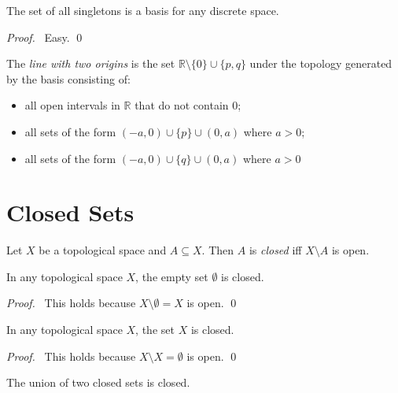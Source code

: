\begin{prop}
  The set of all singletons is a basis for any discrete space.
\end{prop}

\begin{proof}
  \pf\ Easy. \qed
\end{proof}

 \begin{df}
 The \emph{line with two origins} is the set $\mathbb{R} \setminus \{ 0 \}
 \cup \{ p,q \}$ under the topology generated by the basis consisting of:
 \begin{itemize}
   \item all open intervals in $\mathbb{R}$ that do not contain $0$;
   \item all sets of the form $(-a, 0) \cup \{ p \} \cup (0, a)$ where $a
> 0$;
\item all sets of the form $(-a, 0) \cup \{ q \} \cup (0, a)$ where $a > 0$
 \end{itemize}
\end{df}

\section{Closed Sets}

\begin{df}[Closed]
  Let $X$ be a topological space and $A \subseteq X$. Then $A$ is
  \emph{closed}
  iff $X \setminus A$ is open.
\end{df}

\begin{prop}
  \label{prop:topology:closed:empty}
  In any topological space $X$, the empty set $\emptyset$ is closed.
\end{prop}

\begin{proof}
  \pf\ This holds because $X \setminus \emptyset = X$ is open. \qed
\end{proof}

\begin{prop}
  \label{prop:topology:closed:whole_set}
  In any topological space $X$, the set $X$ is closed.
\end{prop}

\begin{proof}
  \pf\ This holds because $X \setminus X = \emptyset$ is open. \qed
\end{proof}

\begin{prop}
  \label{prop:topology:closed:union}
  The union of two closed sets is closed.
\end{prop}


